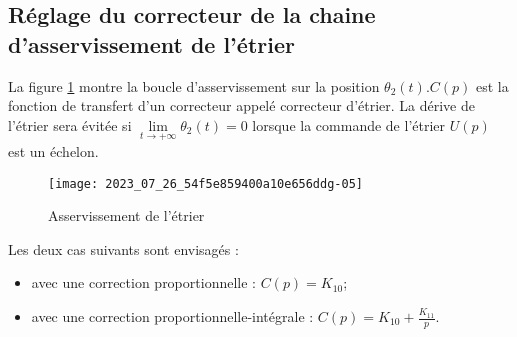 \subsection{\label{sec:II.B} Réglage du correcteur de la chaine d'asservissement de l'étrier}

\ifprof
\else
La figure \ref{fig_ccspsi2022:08} montre la boucle d'asservissement sur la position $\theta_{2}(t) . C(p)$ est la fonction de transfert d'un correcteur appelé correcteur d'étrier. La dérive de l'étrier sera évitée si $\lim\limits_{t \rightarrow+\infty} \theta_{2}(t)=0$ lorsque la commande de l'étrier $U(p)$ est un échelon.

\begin{figure}[!h]
\centering
\texttt{[image: 2023\_07\_26\_54f5e859400a10e656ddg-05]}
\caption{\label{fig_ccspsi2022:08}Asservissement de l'étrier}
\end{figure}

Les deux cas suivants sont envisagés :

\begin{itemize}
  \item avec une correction proportionnelle : $C(p)=K_{10}$;
  \item avec une correction proportionnelle-intégrale : $C(p)=K_{10}+\frac{K_{11}}{p}$.
\end{itemize}
\fi

